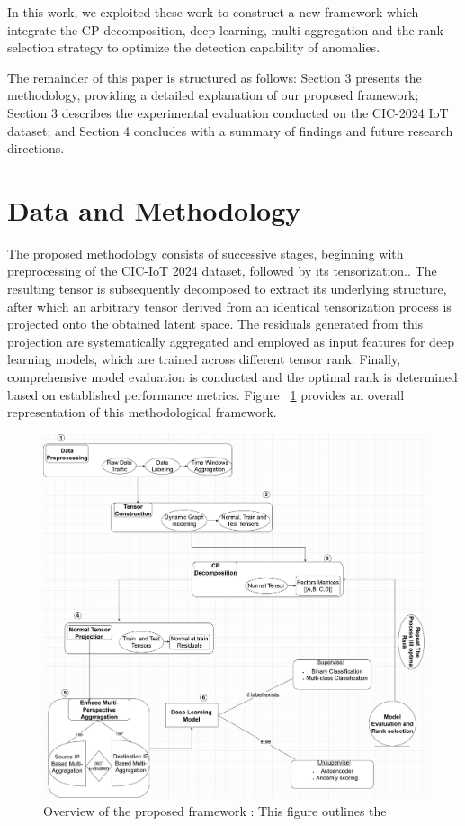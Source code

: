 \documentclass[preprint,12pt,authoryear]{elsarticle}
\begin{document}
In this work, we exploited these work to construct a new framework which integrate the CP decomposition, deep learning,  multi-aggregation and the rank selection strategy to optimize the detection capability of anomalies.


The remainder of this paper is structured as follows: Section 3 presents the methodology, providing a detailed explanation of our proposed framework; Section 3 describes the experimental evaluation conducted on the CIC-2024 IoT dataset; and Section 4 concludes with a summary of findings and future research directions.
  

\section{Data and Methodology}
The proposed methodology consists of successive stages, beginning with preprocessing of the CIC-IoT 2024 dataset, followed by its tensorization.. The resulting tensor is subsequently decomposed to extract its underlying structure, after which an arbitrary tensor derived from an identical tensorization process is projected onto the obtained latent space. The residuals generated from this projection are systematically aggregated and employed as input features for deep learning models, which are trained across different tensor rank. Finally, comprehensive model evaluation is conducted and the optimal rank is determined based on established performance metrics. Figure ~\ref{fig:framework}  provides an overall representation of this methodological framework.
\begin{figure}
    \centering   \includegraphics[width=1.18\linewidth]{Framework_Overview.png}
    \caption{Overview of the proposed framework : This figure outlines the }
    \label{fig:framework}
\end{figure}
\end{document}
